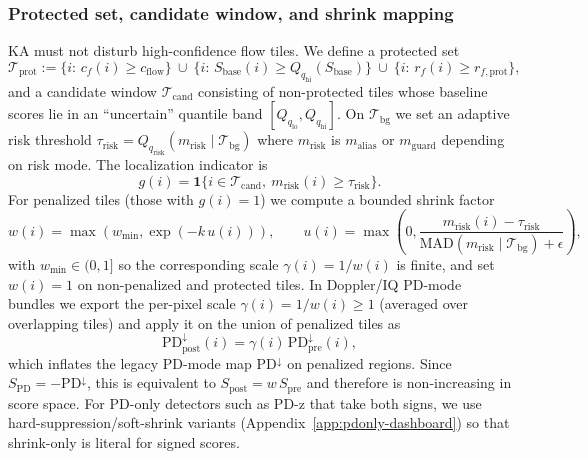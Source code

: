 \subsubsection{Protected set, candidate window, and shrink mapping}
KA must not disturb high-confidence flow tiles. We define a protected set
\[
\mathcal{T}_{\mathrm{prot}}:=\{i:\,c_f(i)\ge c_{\mathrm{flow}}\}\ \cup\ \{i:\,S_{\mathrm{base}}(i)\ge Q_{q_{\mathrm{hi}}}(S_{\mathrm{base}})\}\ \cup\ \{i:\,r_f(i)\ge r_{f,\mathrm{prot}}\},
\]
and a candidate window $\mathcal{T}_{\mathrm{cand}}$ consisting of non-protected tiles whose baseline scores lie in an ``uncertain'' quantile band $[Q_{q_{\mathrm{lo}}},Q_{q_{\mathrm{hi}}}]$. On $\mathcal{T}_{\mathrm{bg}}$ we set an adaptive risk threshold $\tau_{\mathrm{risk}}=Q_{q_{\mathrm{risk}}}(m_{\mathrm{risk}}\mid \mathcal{T}_{\mathrm{bg}})$ where $m_{\mathrm{risk}}$ is $m_{\mathrm{alias}}$ or $m_{\mathrm{guard}}$ depending on risk mode. The localization indicator is
\[
g(i)=\mathbf{1}\{i\in\mathcal{T}_{\mathrm{cand}},\ m_{\mathrm{risk}}(i)\ge\tau_{\mathrm{risk}}\}.
\]
For penalized tiles (those with $g(i)=1$) we compute a bounded shrink factor
\[
w(i)=\max\left(w_{\min},\exp\!\left(-k\,u(i)\right)\right),\qquad
u(i)=\max\!\left(0,\frac{m_{\mathrm{risk}}(i)-\tau_{\mathrm{risk}}}{\mathrm{MAD}(m_{\mathrm{risk}}\mid\mathcal{T}_{\mathrm{bg}})+\epsilon}\right),
\]
with $w_{\min}\in(0,1]$ so the corresponding scale $\gamma(i)=1/w(i)$ is finite, and set $w(i)=1$ on non-penalized and protected tiles. In Doppler/IQ PD-mode bundles we export the per-pixel scale $\gamma(i)=1/w(i)\ge 1$ (averaged over overlapping tiles) and apply it on the union of penalized tiles as
\[
\mathrm{PD}^{\downarrow}_{\mathrm{post}}(i)=\gamma(i)\,\mathrm{PD}^{\downarrow}_{\mathrm{pre}}(i),
\]
which inflates the legacy PD-mode map $\mathrm{PD}^{\downarrow}$ on penalized regions. Since $S_{\mathrm{PD}}=-\mathrm{PD}^{\downarrow}$, this is equivalent to $S_{\mathrm{post}}=w\,S_{\mathrm{pre}}$ and therefore is non-increasing in score space. For PD-only detectors such as PD-z that take both signs, we use hard-suppression/soft-shrink variants (Appendix~\ref{app:pdonly-dashboard}) so that shrink-only is literal for signed scores.

